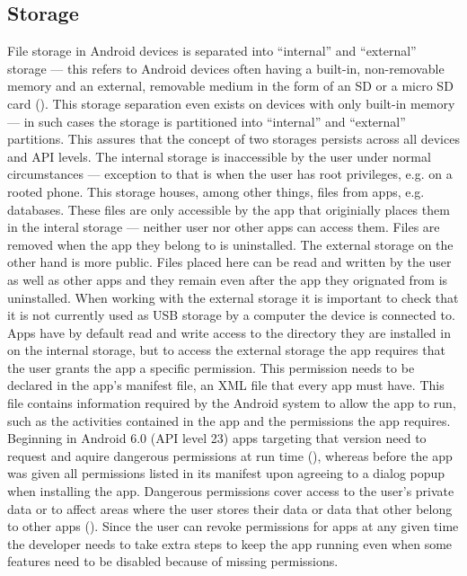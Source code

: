 \subsection{Storage}
\label{android_storage}
File storage in Android devices is separated into ``internal'' and ``external'' storage --- this refers to Android devices often having a built-in, non-removable memory and an external, removable medium in the form of an SD or a micro SD card (\cite{android_storage}). This storage separation even exists on devices with only built-in memory --- in such cases the storage is partitioned into ``internal'' and ``external'' partitions. This assures that the concept of two storages persists across all devices and \gls{API} levels. The internal storage is inaccessible by the user under normal circumstances --- exception to that is when the user has root privileges, e.g. on a rooted phone. This storage houses, among other things, files from apps, e.g. databases. These files are only accessible by the app that originially places them in the interal storage --- neither user nor other apps can access them. Files are removed when the app they belong to is uninstalled. 
The external storage on the other hand is more public. Files placed here can be read and written by the user as well as other apps and they remain even after the app they orignated from is uninstalled. When working with the external storage it is important to check that it is not currently used as \gls{USB} storage by a computer the device is connected to.
Apps have by default read and write access to the directory they are installed in on the internal storage, but to access the external storage the app requires that the user grants the app a specific permission. This permission needs to be declared in the app's manifest file, an \gls{XML} file that every app must have. This file contains information required by the Android system to allow the app to run, such as the activities contained in the app and the permissions the app requires. Beginning in Android 6.0 (\gls{API} level 23) apps targeting that version need to request and aquire dangerous permissions at run time (\cite{android_permissions}), whereas before the app was given all permissions listed in its manifest upon agreeing to a dialog popup when installing the app. Dangerous permissions cover access to the user's private data or to affect areas where the user stores their data or data that other belong to other apps (\cite{android_permissions}). Since the user can revoke permissions for apps at any given time the developer needs to take extra steps to keep the app running even when some features need to be disabled because of missing permissions.  
